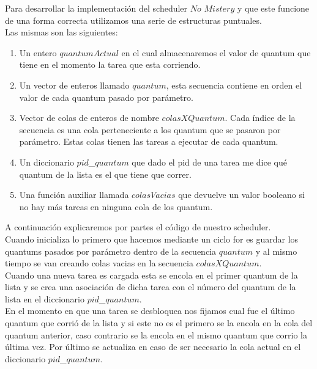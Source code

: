 Para desarrollar la implementación del scheduler $No$ $Mistery$ y que este funcione de una forma correcta
utilizamos una serie de estructuras puntuales. \\
Las mismas son las siguientes:\\
\begin{enumerate}
\item Un entero $quantumActual$ en el cual almacenaremos el valor de quantum que tiene en el momento la tarea que esta corriendo.
\item Un vector de enteros llamado $quantum$, esta secuencia contiene en orden el valor de cada quantum pasado por par\'{a}metro.
\item Vector de colas de enteros de nombre $colasXQuantum$. Cada \'{i}ndice de la secuencia es una cola perteneciente a los quantum 
que se pasaron por par\'{a}metro. Estas colas tienen las tareas a ejecutar de cada quantum.
\item Un diccionario $pid$\_$quantum$ que dado el pid de una tarea me dice qu\'{e} quantum de la lista es el que tiene que correr.
\item Una funci\'{o}n auxiliar llamada $colasVacias$ que devuelve un valor booleano si no hay m\'{a}s tareas en ninguna cola de los 
quantum.
\end{enumerate}

A continuaci\'{o}n explicaremos por partes el c\'{o}digo de nuestro scheduler.\\

Cuando inicializa lo primero que hacemos mediante un ciclo for es guardar los quantums pasados por par\'{a}metro dentro de la 
secuencia $quantum$ y al mismo tiempo se van creando colas vacias en la secuencia $colasXQuantum$.\\

Cuando una nueva tarea es cargada esta se encola en el primer quantum de la lista y se crea una asociaci\'{o}n de dicha tarea 
con el número del quantum de la lista en el diccionario $pid$\_$quantum$.\\

En el momento en que una tarea se desbloquea nos fijamos cual fue el \'{u}ltimo quantum que corrió de la lista y si este no es 
el primero se la encola en la cola del quantum anterior, caso contrario se la encola en el mismo quantum que corrio la \'{u}ltima vez.
Por \'{u}ltimo se actualiza en caso de ser necesario la cola actual en el diccionario $pid$\_$quantum$.\\

